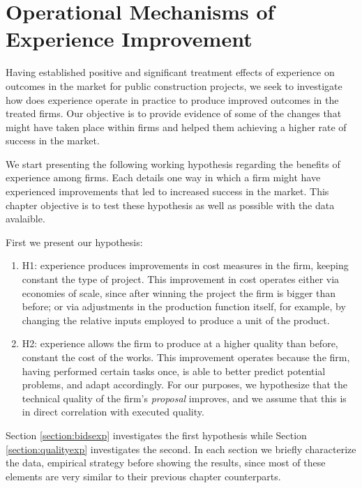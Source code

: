 \chapter{Operational Mechanisms of Experience Improvement}
Having established positive and significant treatment effects of  experience on outcomes in the market for public construction projects, we seek to investigate how does experience operate in practice to produce improved outcomes in the treated firms. Our objective is to provide evidence of some of the changes that might have taken place within firms and helped them achieving a higher rate of success in the market.

We start presenting the following working hypothesis regarding the benefits of experience among firms. Each details one way in which a firm might have experienced improvements that led to increased success in the market. This chapter objective is to test these hypothesis as well as possible with the data avalaible.

First we present our hypothesis:
\begin{enumerate}
  \item{H1}: experience produces improvements in cost measures in the firm, keeping constant the type of project. This improvement in cost operates either via economies of scale, since after winning the project the firm is bigger than before; or via adjustments in the production function itself, for example, by changing the relative inputs employed to produce a unit of the product.
  \item{H2}: experience allows the firm to produce at a higher quality than before, constant the cost of the works. This improvement operates because the firm, having performed certain tasks once, is able to better predict potential problems, and adapt accordingly. For our purposes, we hypothesize that the technical quality of the firm's \textit{proposal} improves, and we assume that this is in direct correlation with executed quality.
\end{enumerate}

Section \ref{section:bidsexp} investigates the first hypothesis while Section \ref{section:qualityexp} investigates the second. In each section we briefly characterize the data, empirical strategy before showing the results, since most of these elements are very similar to their previous chapter counterparts.


